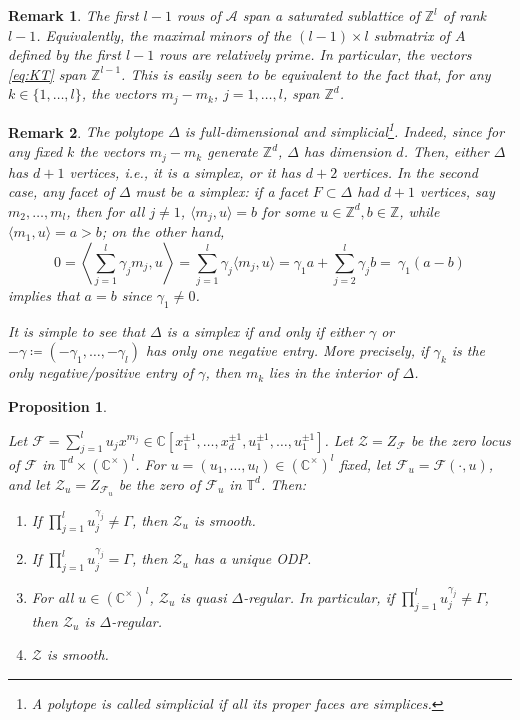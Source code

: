 \documentclass[10pt,a4paper]{amsart}
\newtheorem{rem}{Remark}
\newtheorem{prop}{Proposition}
\newcommand{\CC}{\mathbb{C}}
\newcommand{\TT}{\mathbb{T}}
\newcommand{\ZZ}{\mathbb{Z}}
\newcommand{\ga}{\gamma}
\begin{document}
\begin{rem}
\label{rem:kernel}
The first $l-1$ rows of $\mathcal{A}$ span a saturated sublattice of $\ZZ^l$ of rank $l-1$. 
Equivalently, the maximal minors of the $(l-1)\times l$ submatrix of $A$ defined by the first $l-1$ rows are relatively prime. In particular, the vectors 
\eqref{eq:KT}
    span $\ZZ^{l-1}$. This is easily seen to be equivalent to the fact that, for any $k \in \{1, \dots, l\}$, the vectors $m_j-m_k$, $j=1, \dots, l$, span $\ZZ^d$. 
\end{rem}

\begin{rem}
\label{rem:mj-polytope}
The polytope $\Delta$ is full-dimensional and simplicial\footnote{A polytope is called simplicial if all its proper faces are simplices.}. 
Indeed, since for any fixed $k$ the vectors $m_j-m_{k}$ generate $\ZZ^d$, $\Delta$ has dimension $d$. Then, either $\Delta$ has $d+1$ vertices, i.e., it is a simplex, or it has $d+2$ vertices. In the second case, any facet of $\Delta$ must be a simplex: if a facet $F \subset \Delta$ had $d+1$ vertices, say $m_2, \dots, m_l$, then  for all $j \neq 1$,  $\langle m_j, u\rangle =b$ for some $u \in \ZZ^d, b \in \ZZ$, while $\langle m_1, u\rangle =a>b$; on the other hand, 
\[
0=\left\langle \sum_{j=1}^l \gamma_j m_j, u \right\rangle =\sum_{j=1}^l \gamma_j \langle m_j, u \rangle=  \gamma_1a+\sum_{j=2}^l \gamma_j b   = \ \gamma_1 (a -b)
\] 
implies that $a=b$ since $\ga_1 \neq 0$. 

It is simple to see that $\Delta$ is a simplex if and only if either $\gamma$ or $-\gamma\coloneqq (-\gamma_1, \dots, -\gamma_l)$  has only one negative entry. More precisely, if $\gamma_k$ is the only negative/positive entry of $\gamma$, then $m_k$ lies in the interior of $\Delta$. 
\end{rem}

\begin{prop}
\label{prop:u-result} 

Let $\mathcal{F}=\sum_{j=1}^l u_j x^{m_j} \in \CC[x_1^{\pm 1}, \dots, x_d^{\pm 1}, u_1^{\pm 1}, \dots, u_1^{\pm 1}]$. Let $\mathcal{Z}=Z_\mathcal{F}$ be the zero locus of $\mathcal{F}$ in $\TT^d \times (\CC^\times)^l$. 
For $u=(u_1, \dots, u_l) \in (\CC^\times)^l$ fixed, let $\mathcal{F}_u=\mathcal{F}(\cdot,u)$, and let $\mathcal{Z}_u=Z_{\mathcal{F}_u}$ be the zero of $\mathcal{F}_u$ in $\TT^d$. Then:   
    \begin{enumerate}
    \item  If $\prod_{j=1}^l u_j^{\gamma_j} \neq \Gamma$, then $\mathcal{Z}_u$ is smooth. 
    \item  If $\prod_{j=1}^l u_j^{\gamma_j} = \Gamma$, then $\mathcal{Z}_u$ has a unique ODP.  
    \item  For all $u \in (\CC^\times)^l$, $\mathcal{Z}_u$ is quasi $\Delta$-regular. In particular, if $\prod_{j=1}^l u_j^{\gamma_j} \neq \Gamma$, then $\mathcal{Z}_u$ is $\Delta$-regular. 
    \item $\mathcal{Z}$ is smooth.
    \end{enumerate}
\end{prop}
\end{document}
